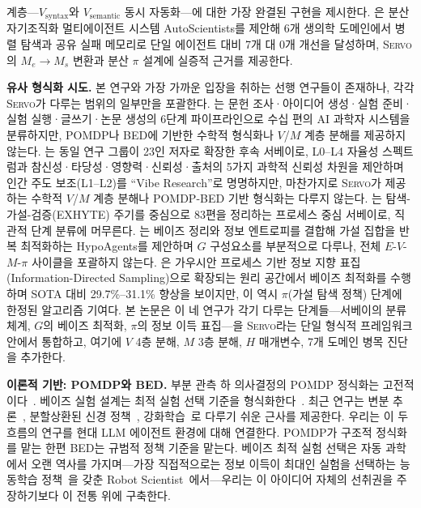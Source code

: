 \documentclass[11pt]{article}
\newcommand{\framework}{\textsc{Servo}}
\begin{document}
계층---$V_\text{syntax}$와 $V_\text{semantic}$ 동시 자동화---에 대한 가장 완결된 구현을 제시한다. \citet{gao2026autoscientists}은 분산 자기조직화 멀티에이전트 시스템 AutoScientists를 제안해 6개 생의학 도메인에서 병렬 탐색과 공유 실패 메모리로 단일 에이전트 대비 7개 대 0개 개선을 달성하며, \framework{}의 $M_e \to M_s$ 변환과 분산 $\pi$ 설계에 실증적 근거를 제공한다.

\textbf{유사 형식화 시도.} 본 연구와 가장 가까운 입장을 취하는 선행 연구들이 존재하나, 각각 \framework{}가 다루는 범위의 일부만을 포괄한다. \citet{tie2025survey}는 문헌 조사·아이디어 생성·실험 준비·실험 실행·글쓰기·논문 생성의 6단계 파이프라인으로 수십 편의 AI 과학자 시스템을 분류하지만, POMDP나 BED에 기반한 수학적 형식화나 $V$/$M$ 계층 분해를 제공하지 않는다. \citet{tie2026autoresearch}는 동일 연구 그룹이 23인 저자로 확장한 후속 서베이로, L0--L4 자율성 스펙트럼과 참신성·타당성·영향력·신뢰성·출처의 5가지 과학적 신뢰성 차원을 제안하며 인간 주도 보조(L1--L2)를 ``Vibe Research''로 명명하지만, 마찬가지로 \framework{}가 제공하는 수학적 $V$/$M$ 계층 분해나 POMDP-BED 기반 형식화는 다루지 않는다. \citet{exhyte2025}는 탐색-가설-검증(EXHYTE) 주기를 중심으로 83편을 정리하는 프로세스 중심 서베이로, 직관적 단계 분류에 머무른다. \citet{hypoagents2025}는 베이즈 정리와 정보 엔트로피를 결합해 가설 집합을 반복 최적화하는 HypoAgents를 제안하며 $G$ 구성요소를 부분적으로 다루나, 전체 $E$-$V$-$M$-$\pi$ 사이클을 포괄하지 않는다. \citet{pievo2026}은 가우시안 프로세스 기반 정보 지향 표집(Information-Directed Sampling)으로 확장되는 원리 공간에서 베이즈 최적화를 수행하며 SOTA 대비 29.7\%--31.1\% 향상을 보이지만, 이 역시 $\pi$(가설 탐색 정책) 단계에 한정된 알고리즘 기여다. 본 논문은 이 네 연구가 각기 다루는 단계들---서베이의 분류 체계, $G$의 베이즈 최적화, $\pi$의 정보 이득 표집---을 \framework{}라는 단일 형식적 프레임워크 안에서 통합하고, 여기에 $V$ 4층 분해, $M$ 3층 분해, $H$ 매개변수, 7개 도메인 병목 진단을 추가한다.

\textbf{이론적 기반: POMDP와 BED.} 부분 관측 하 의사결정의 POMDP 정식화는 고전적이다~\citep{kaelbling1998pomdp}. 베이즈 실험 설계는 최적 실험 선택 기준을 형식화한다~\citep{chaloner1995bayesian}. 최근 연구는 변분 추론~\citep{foster2019variational}, 분할상환된 신경 정책~\citep{foster2021dad}, 강화학습~\citep{blau2022rl}로 다루기 쉬운 근사를 제공한다. 우리는 이 두 흐름의 연구를 현대 LLM 에이전트 환경에 대해 연결한다. POMDP가 구조적 정식화를 맡는 한편 BED는 규범적 정책 기준을 맡는다. 베이즈 최적 실험 선택은 자동 과학에서 오랜 역사를 가지며---가장 직접적으로는 정보 이득이 최대인 실험을 선택하는 능동학습 정책~\citep{king2004robot}을 갖춘 Robot Scientist~\citep{sparkes2010robot}에서---우리는 이 아이디어 자체의 선취권을 주장하기보다 이 전통 위에 구축한다.
\end{document}
